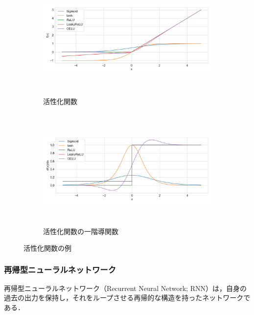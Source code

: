 \begin{figure}[tb]
    \centering
    \begin{subfigure}[b]{1.0\textwidth}
        \centering
        \includegraphics[height=6cm]{./figure/sec3/activations.png}
        \caption{活性化関数}
        \label{sec3:fig:activations}
    \end{subfigure}
    \begin{subfigure}[b]{1.0\textwidth}
        \centering
        \includegraphics[height=6cm]{./figure/sec3/activations_prime.png}
        \caption{活性化関数の一階導関数}
        \label{sec3:fig:activations_prime}
    \end{subfigure}
    \caption{活性化関数の例}
    \label{sec3:fig:activations_and_their_prime}
\end{figure}

\subsubsection{再帰型ニューラルネットワーク}
再帰型ニューラルネットワーク（Recurrent Neural Network; RNN）は，自身の過去の出力を保持し，それをループさせる再帰的な構造を持ったネットワークである．

